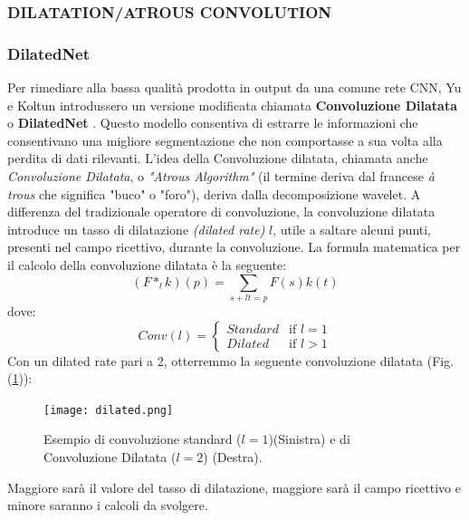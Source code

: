 \subsubsection{DILATATION/ATROUS CONVOLUTION}
\subsubsection{DilatedNet}
Per rimediare alla bassa qualità prodotta in output da una comune rete CNN, Yu 
e Koltun introdussero un versione modificata chiamata {\bfseries{Convoluzione Dilatata}} 
o {\bfseries{DilatedNet}} \cite{DilatedNet}. Questo modello consentiva di estrarre le informazioni che 
consentivano una migliore segmentazione che non comportasse a sua volta alla 
perdita di dati rilevanti. L'idea della Convoluzione dilatata, chiamata anche 
\emph{Convoluzione Dilatata}, o \emph{"Atrous Algorithm"} (il termine deriva dal francese \emph{à trous} che significa "buco" o "foro"),  deriva dalla decomposizione wavelet. A differenza del 
tradizionale operatore di convoluzione, la convoluzione dilatata introduce un tasso 
di dilatazione \emph{(dilated rate)} $l$, utile a saltare alcuni punti, presenti nel 
campo ricettivo, durante la convoluzione. La formula matematica per il calcolo della 
convoluzione dilatata è la seguente:
\begin{equation}
    (F*_lk)(p) = \sum_{s+lt=p}F(s)k(t)
\end{equation}
dove:
\begin{equation}\label{dilated rate}
    Conv(l) = \left\{
        \begin{array}{rl}
        Standard & \mbox{if } l = 1\\
        Dilated & \mbox{if } l > 1
        \end{array}
        \right.
\end{equation}
Con un dilated rate pari a 2, otterremmo la seguente convoluzione dilatata (Fig. (\ref{dilated})):
\begin{figure}
    \centering
    \texttt{[image: dilated.png]}
    \centering
    \caption{Esempio di convoluzione standard ($l=1$)(Sinistra) e di Convoluzione Dilatata ($l=2$) (Destra).}
    \label{dilated}
\end{figure}
Maggiore sarà il valore del tasso di dilatazione, maggiore sarà il campo ricettivo 
e minore saranno i calcoli da svolgere. 


